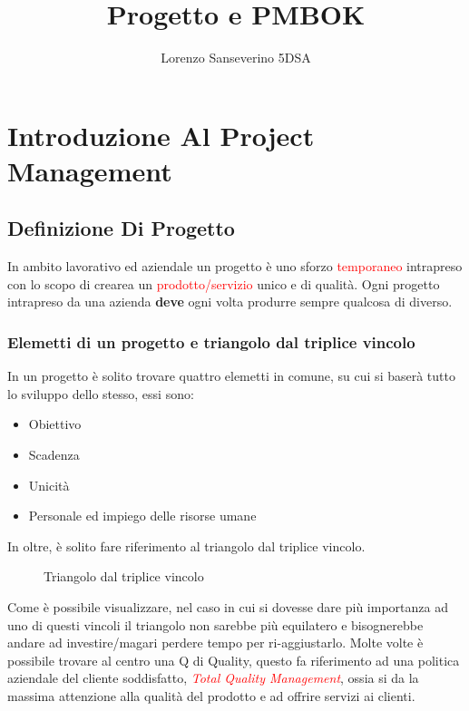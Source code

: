 \documentclass{report}
\title{Progetto e PMBOK}
\author{Lorenzo Sanseverino 5DSA}
\begin{document}
\tableofcontents
\maketitle




\chapter{Introduzione Al Project Management}
\section{Definizione Di Progetto}

In ambito lavorativo ed aziendale un progetto è uno sforzo \textcolor{red}{temporaneo} intrapreso con lo scopo di crearea un \textcolor{red}{prodotto/servizio} unico e di qualità.
Ogni progetto intrapreso da una azienda \textbf{deve} ogni volta produrre sempre qualcosa di diverso. 

\subsection{Elemetti di un progetto e triangolo dal triplice vincolo}
In un progetto è solito trovare quattro elemetti in comune, su cui si baserà tutto lo sviluppo dello stesso, essi sono:

\begin{itemize}
\item Obiettivo
\item Scadenza
\item Unicità
\item Personale ed impiego delle risorse umane
\end{itemize}

In oltre, è solito fare riferimento al triangolo dal triplice vincolo.
\begin{figure}[h]
\caption{Triangolo dal triplice vincolo}
\label{t}
\end{figure}
Come è possibile visualizzare, nel caso in cui si dovesse dare più importanza ad uno di questi vincoli il triangolo non sarebbe più equilatero e bisognerebbe andare ad investire/magari perdere tempo per ri-aggiustarlo.
Molte volte è possibile trovare al centro una Q di Quality, questo fa riferimento ad una politica aziendale del cliente soddisfatto, \textit{\textcolor{red}{Total Quality Management}}, ossia si da la massima attenzione alla qualità del prodotto e ad offrire servizi ai clienti.
\end{document}
